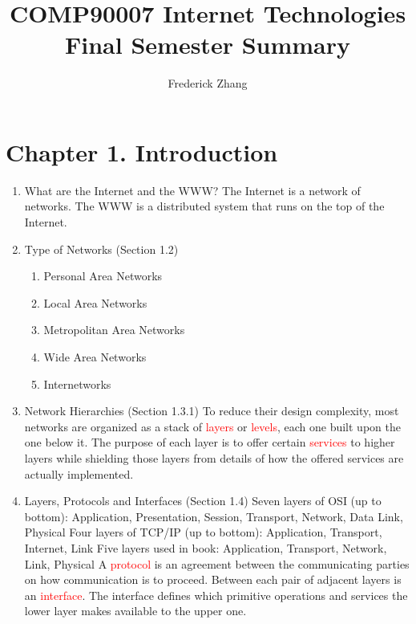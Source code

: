\documentclass[a4paper,10pt]{article}
\title{\vspace*{\fill}COMP90007 Internet Technologies\\Final Semester Summary\vspace*{\fill}}
\author{Frederick Zhang}
\newcommand{\red}[1]{\textcolor{red}{#1}}
\begin{document}
\begin{titlepage}
  \maketitle
  \thispagestyle{empty}
\end{titlepage}

\section*{Chapter 1. Introduction}
\begin{enumerate}
  \item What are the Internet and the WWW?
    \newline The Internet is a network of networks.
    \newline The WWW is a distributed system that runs on the top of the Internet.
  
  \item Type of Networks (Section 1.2)
    \begin{enumerate}
      \item Personal Area Networks
      \item Local Area Networks
      \item Metropolitan Area Networks
      \item Wide Area Networks
      \item Internetworks
    \end{enumerate}
  
  \item Network Hierarchies (Section 1.3.1)
    \newline To reduce their design complexity, most networks are organized as a stack of \red{layers} or \red{levels}, each one built upon the one below it. The purpose of each layer is to offer certain \red{services} to higher layers while shielding those layers from details of how the offered services are actually implemented.
  
  \item Layers, Protocols and Interfaces (Section 1.4)
    \newline Seven layers of OSI (up to bottom): Application, Presentation, Session, Transport, Network, Data Link, Physical
    \newline Four layers of TCP/IP (up to bottom): Application, Transport, Internet, Link
    \newline Five layers used in book: Application, Transport, Network, Link, Physical
    \newline
    \newline A \red{protocol} is an agreement between the communicating parties on how communication is to proceed.
    \newline Between each pair of adjacent layers is an \red{interface}. The interface defines which primitive operations and services the lower layer makes available to the upper one. 
  

\end{enumerate}
\end{document}
